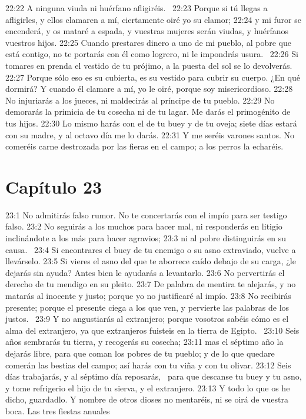 22:22 A ninguna viuda ni huérfano afligiréis.  
22:23 Porque si tú llegas a afligirles, y ellos clamaren a mí, ciertamente oiré yo su clamor; 
22:24 y mi furor se encenderá, y os mataré a espada, y vuestras mujeres serán viudas, y huérfanos vuestros hijos. 
22:25 Cuando prestares dinero a uno de mi pueblo, al pobre que está contigo, no te portarás con él como logrero, ni le impondrás usura.  
22:26 Si tomares en prenda el vestido de tu prójimo, a la puesta del sol se lo devolverás. 
22:27 Porque sólo eso es su cubierta, es su vestido para cubrir su cuerpo. ¿En qué dormirá? Y cuando él clamare a mí, yo le oiré, porque soy misericordioso. 
22:28 No injuriarás a los jueces, ni maldecirás al príncipe de tu pueblo. 
22:29 No demorarás la primicia de tu cosecha ni de tu lagar. Me darás el primogénito de tus hijos. 
22:30 Lo mismo harás con el de tu buey y de tu oveja; siete días estará con su madre, y al octavo día me lo darás. 
22:31 Y me seréis varones santos. No comeréis carne destrozada por las fieras en el campo; a los perros la echaréis. 
\section*{Capítulo 23}

23:1 No admitirás falso rumor. No te concertarás con el impío para ser testigo falso. 
23:2 No seguirás a los muchos para hacer mal, ni responderás en litigio inclinándote a los más para hacer agravios; 
23:3 ni al pobre distinguirás en su causa.  
23:4 Si encontrares el buey de tu enemigo o su asno extraviado, vuelve a llevárselo. 
23:5 Si vieres el asno del que te aborrece caído debajo de su carga, ¿le dejarás sin ayuda? Antes bien le ayudarás a levantarlo. 
23:6 No pervertirás el derecho de tu mendigo en su pleito. 
23:7 De palabra de mentira te alejarás, y no matarás al inocente y justo; porque yo no justificaré al impío. 
23:8 No recibirás presente; porque el presente ciega a los que ven, y pervierte las palabras de los justos.  
23:9 Y no angustiarás al extranjero; porque vosotros sabéis cómo es el alma del extranjero, ya que extranjeros fuisteis en la tierra de Egipto.  
23:10 Seis años sembrarás tu tierra, y recogerás su cosecha; 
23:11 mas el séptimo año la dejarás libre, para que coman los pobres de tu pueblo; y de lo que quedare comerán las bestias del campo; así harás con tu viña y con tu olivar. 
23:12 Seis días trabajarás, y al séptimo día reposarás,  para que descanse tu buey y tu asno, y tome refrigerio el hijo de tu sierva, y el extranjero. 
23:13 Y todo lo que os he dicho, guardadlo. Y nombre de otros dioses no mentaréis, ni se oirá de vuestra boca. 
Las tres fiestas anuales 

